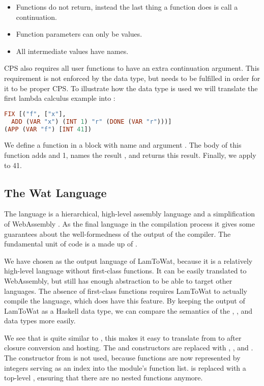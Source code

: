 {\begin{itemize}
\item Functions do not return, instead the last thing a function does is call a continuation.
\item Function parameters can only be values.
\item All intermediate values have names.
\end{itemize}

CPS also requires all user functions to have an extra continuation argument. This requirement is not enforced by the data type, but needs to be fulfilled in order for it to be proper CPS. To illustrate how the  data type is used we will translate the first lambda calculus example into :

\begin{lstlisting}[language=Haskell]
FIX [("f", ["x"],
  ADD (VAR "x") (INT 1) "r" (DONE (VAR "r")))]
(APP (VAR "f") [INT 41])
\end{lstlisting}

We define a function in a  block with name  and argument . The body of this function adds  and 1, names the result , and returns this result. Finally, we apply  to 41.

\subsection{\label{subsection:webdata}The Wat Language}
The  language is a hierarchical, high-level assembly language and a simplification of WebAssembly \autocite{webassemblyhomepage}. As the final language in the compilation process it gives some guarantees about the well-formedness of the output of the compiler. The fundamental unit of code is a  made up of .

We have chosen  as the output language of LamToWat, because it is a relatively high-level language without first-class functions. It can be easily translated to WebAssembly, but still has enough abstraction to be able to target other languages. The absence of first-class functions requires LamToWat to actually compile the  language, which does have this feature. By keeping the output of LamToWat as a Haskell data type, we can compare the semantics of the , , and  data types more easily.

We see that  is quite similar to , this makes it easy to translate from  to  after closure conversion and hosting. The  and  constructors are replaced with , , and . The  constructor from  is not used, because functions are now represented by integers serving as an index into the module's function list.  is replaced with a top-level , ensuring that there are no nested functions anymore.

}

